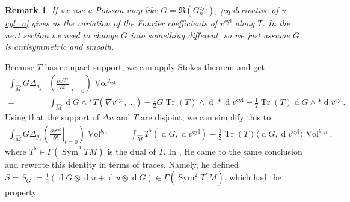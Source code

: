 \documentclass[preprint,12pt]{elsarticle}
\numberwithin{table}{section}
\newtheorem{remark}[lemma]{Remark}
\newcommand{\del}{\partial}
\newcommand{\Vol}{\operatorname{Vol}}
\renewcommand{\d}{\operatorname{d}\!}
\newcommand{\Tr}{\operatorname{Tr}}
\begin{document}
\begin{remark}
	If we use a Poisson map like $G = \Re(G^{\mathrm{cyl}}_{n})$, \cref{eq:derivative-of-v-cyl_n} gives us the variation of the Fourier coefficients of $v^{\mathrm{cyl}}$ along $T$. In the next section we need to change $G$ into something different, so we just assume $G$ is antisymmetric and smooth. 
\end{remark}

Because $T$ has compact support, we can apply Stokes theorem and get
\begin{align}
	\int_{\hat{M}} G \Delta_{g_{s}} & \left(
		\left.	\frac{\del v^{\mathrm{cyl}}}{\del t} \right|_{t=0}
	   \right) \Vol^{g_{\mathrm{cyl}}} \\
	   =& \int_{\hat{M}} \d G \wedge * T(\nabla v^{\mathrm{cyl}}, \ldots)
	   - \frac{1}{2} G \Tr(T) \wedge \d * \d v^{\mathrm{cyl}} 
	   - \frac{1}{2}\Tr(T) \d G \wedge * \d v^{\mathrm{cyl}}.
\end{align}
Using that the support of $\Delta u$ and $T$ are disjoint, we can simplify this to
\begin{align}
	\int_{\hat{M}} G \Delta_{g_{s}} \left(
		\left.	\frac{\del v^{\mathrm{cyl}}}{\del t} \right|_{t=0}
	   \right) \Vol^{g_{\mathrm{cyl}}}
	   =& \int_{\hat{M}} T^{\flat}(\d G, \d v^{\mathrm{cyl}})
	   - \frac{1}{2} \Tr(T) \langle \d G, \d v^{\mathrm{cyl}}  \rangle \Vol^{g_{\mathrm{cyl}}}, 
\end{align}
where $T^\flat \in \Gamma(\operatorname{Sym}^2 TM)$ is the dual of $T$.
In \cite{He2022}, He came to the same conclusion and rewrote this identity in terms of traces. Namely, he defined $S = S_G := \frac{1}{2} (\d G \otimes \d u + \d u \otimes \d G) \in \Gamma(\operatorname{Sym}^2 T^*M)$, which had the property
\end{document}
